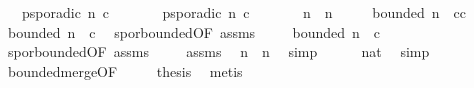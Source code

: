 \begin{isabellebody}
\ \ \ {\isacartoucheopen}p{\isacharunderscore}sporadic\ n\ c{\isacartoucheclose}\isanewline
\ \ \ \ \ \ \ {\isacartoucheopen}p{\isacharunderscore}sporadic\ n{\isacharprime}\ c{\isacharprime}{\isacartoucheclose}\isanewline
\ \ \ \ \ \ \ {\isacartoucheopen}n{\isacharprime}\ {\isasymge}\ n{\isacartoucheclose}\isanewline
\ \ \ \ \ {\isacartoucheopen}bounded\ {\isacharparenleft}n{\isacharplus}{}{\isacharparenright}\ {}\ {\isacharparenleft}c{\isasymoplus}c{\isacharprime}{\isacharparenright}{\isacartoucheclose}\isanewline
%
\isadelimproof
%
\endisadelimproof
%
\isatagproof
{}\isamarkupfalse%
\ {\isacharminus}\isanewline
\ \ \isamarkupfalse%
\ {}{\isacharcolon}{\isacartoucheopen}bounded\ {\isacharparenleft}n{\isacharplus}{}{\isacharparenright}\ {}\ c{\isacartoucheclose}\ \isamarkupfalse%
\ spor{\isacharunderscore}bounded{\isacharbrackleft}OF\ assms{\isacharparenleft}{}{\isacharparenright}{\isacharbrackright}\ \isacommand{{\isachardot}}\isamarkupfalse%
\isanewline
\ \ \isamarkupfalse%
\ {}{\isacharcolon}{\isacartoucheopen}bounded\ {\isacharparenleft}n{\isacharprime}{\isacharplus}{}{\isacharparenright}\ {}\ c{\isacharprime}{\isacartoucheclose}\ \isamarkupfalse%
\ spor{\isacharunderscore}bounded{\isacharbrackleft}OF\ assms{\isacharparenleft}{}{\isacharparenright}{\isacharbrackright}\ \isacommand{{\isachardot}}\isamarkupfalse%
\isanewline
\ \ \isamarkupfalse%
\ assms{\isacharparenleft}{}{\isacharparenright}\ \isamarkupfalse%
\ {}{\isacharcolon}{\isacartoucheopen}n{\isacharprime}{\isacharplus}{}\ {\isasymge}\ n{\isacharplus}{}{\isacartoucheclose}\ \isamarkupfalse%
\ simp\isanewline
\ \ \isamarkupfalse%
\ {\isacartoucheopen}{}{\isacharplus}{}\ {\isacharequal}\ {\isacharparenleft}{}{\isacharcolon}{\isacharcolon}nat{\isacharparenright}{\isacartoucheclose}\ \isamarkupfalse%
\ simp\isanewline
\ \ \isamarkupfalse%
\ bounded{\isacharunderscore}merge{\isacharbrackleft}OF\ {}\ {}\ {}{\isacharbrackright}\ \isamarkupfalse%
\ {\isacharquery}thesis\ \isamarkupfalse%
\ metis\isanewline
{}\isamarkupfalse%
%
\endisatagproof
{\isafoldproof}%
%
\isadelimproof

\end{isabellebody}
